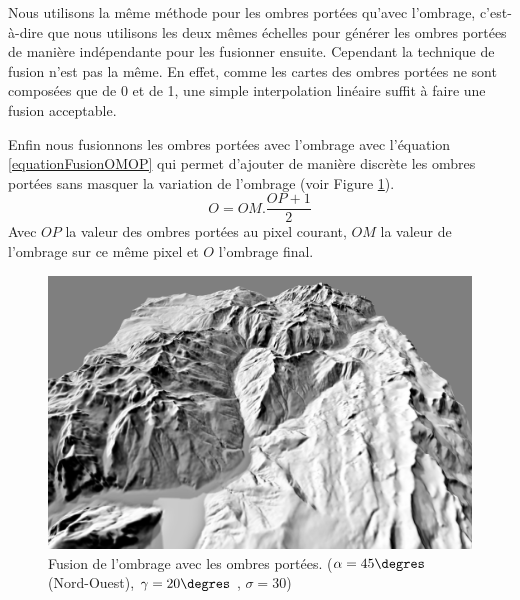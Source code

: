 Nous utilisons la même méthode pour les ombres portées qu'avec l'ombrage, c'est-à-dire que nous utilisons les deux mêmes échelles pour générer les ombres portées de manière indépendante pour les fusionner ensuite. Cependant la technique de fusion n'est pas la même. En effet, comme les cartes des ombres portées ne sont composées que de 0 et de 1, une simple interpolation linéaire suffit à faire une fusion acceptable. 


Enfin nous fusionnons les ombres portées avec l'ombrage avec l’équation \ref{equationFusionOMOP} qui permet d'ajouter de manière discrète les ombres portées sans masquer la variation de l'ombrage (voir Figure \ref{fig:shadow_shade}). 
\begin{equation}
\label{equationFusionOMOP}
O = OM . \frac{OP+1}{2}
\end{equation} 
Avec $OP$ la valeur des ombres portées au pixel courant, $OM$ la valeur de l'ombrage sur ce même pixel et $O$ l’ombrage final.

\begin{figure}[h!]
\centering
\includegraphics[width=1.0\linewidth]{Solution/shadow_shade.png}
\caption{\label{fig:shadow_shade}Fusion de l'ombrage avec les ombres portées. ($\alpha =  45\degres$ (Nord-Ouest), $\gamma = 20\degres$ , $\sigma = 30$)}
\end{figure}




